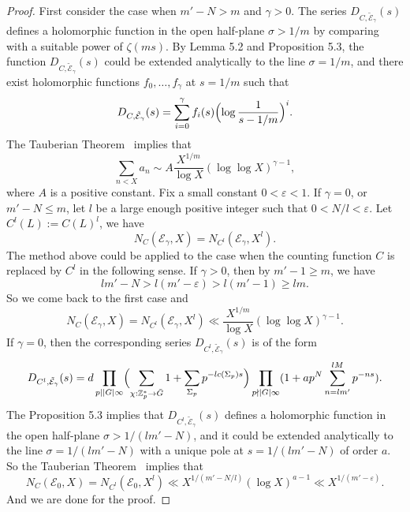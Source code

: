 \documentclass{amsart}
\numberwithin{equation}{section}
\theoremstyle{plain}
\theoremstyle{definition}
\theoremstyle{remark}
\begin{document}
\begin{proof}
	First consider the case when $m'-N>m$ and $\gamma>0$.
	The series $D_{C,\tilde{\mathcal{E}}_{\gamma}}(s)$ defines a holomorphic function in the open half-plane $\sigma>1/m$ by comparing with a suitable power of $\zeta(ms)$.
	By Lemma 5.2 and Proposition 5.3, the function $D_{C,\tilde{\mathcal{E}}_{\gamma}}(s)$ could be extended analytically to the line $\sigma=1/m$, and there exist holomorphic functions $f_0,\dots,f_{\gamma}$ at $s=1/m$ such that
	\begin{equation*}
		D_{C,\tilde{\mathcal{E}}_{\gamma}}(s)=\sum_{i=0}^{\gamma}f_i(s)\Bigl(\log\frac{1}{s-1/m}\Bigr)^{i}.
	\end{equation*}
	The Tauberian Theorem~\cite[Appendix II Theorem I]{narkiewicz2014elementary} implies that
	\begin{equation*}
		\sum_{n<X}a_n\sim A\frac{X^{1/m}}{\log X}(\log\log X)^{\gamma-1},
	\end{equation*}
	where $A$ is a positive constant.
	Fix a small constant $0<\varepsilon<1$.
	If $\gamma=0$, or $m'-N\leq m$, let $l$ be a large enough positive integer such that $0<N/l<\varepsilon$.
	Let $C^l(L):=C(L)^l$, we have
	\begin{equation*}
		N_C(\mathcal{E}_{\gamma},X)=N_{C^l}(\mathcal{E}_{\gamma},X^l).
	\end{equation*}
	The method above could be applied to the case when the counting function $C$ is replaced by $C^l$ in the following sense.
	If $\gamma>0$, then by $m'-1\geq m$, we have
	\begin{equation*}
		lm'-N>l(m'-\varepsilon)>l(m'-1)\geq lm.
	\end{equation*}
	So we come back to the first case and
	\begin{equation*}
		N_C(\mathcal{E}_{\gamma},X)=N_{C^l}(\mathcal{E}_{\gamma},X^l)\ll\frac{X^{1/m}}{\log X}(\log\log X)^{\gamma-1}.
	\end{equation*}
	If $\gamma=0$, then the corresponding series $D_{C^l,\tilde{\mathcal{E}}_{\gamma}}(s)$ is of the form
	\begin{equation*}
		D_{C^l,\tilde{\mathcal{E}}_{\gamma}}(s)=d\prod_{p\mid\lvert G\rvert\infty}\Bigl(\sum_{\chi:\mathbb{Z}_p^*\to\bar{G}}1+\sum_{\Sigma_p}p^{-lc(\Sigma_p)s}\Bigr)
		\prod_{p\nmid\lvert G\rvert\infty}(1+ap^N\sum_{n=lm'}^{lM} p^{-ns}).
	\end{equation*}
	The Proposition 5.3 implies that $D_{C^l,\tilde{\mathcal{E}}_{\gamma}}(s)$ defines a holomorphic function in the open half-plane $\sigma>1/(lm'-N)$, and it could be extended analytically to the line $\sigma=1/(lm'-N)$ with a unique pole at $s=1/(lm'-N)$ of order $a$.
	So the Tauberian Theorem~\cite[Appendix II Theorem I]{narkiewicz2014elementary} implies that
	\begin{equation*}
		N_C(\mathcal{E}_{0},X)=N_{C^l}(\mathcal{E}_{0},X^l)\ll X^{1/(m'-N/l)}(\log X)^{a-1}\ll X^{1/(m'-\varepsilon)}.
	\end{equation*}
	And we are done for the proof.
\end{proof}
\end{document}
